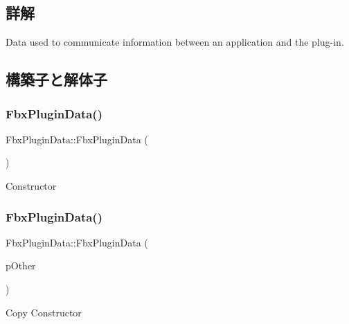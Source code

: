\subsection{詳解}
Data used to communicate information between an application and the plug-\/in. 

\subsection{構築子と解体子}
\mbox{\label{struct_fbx_plugin_data_a4fb32fb98910a0e08a042710f62cd9bd}} 
\subsubsection{\texorpdfstring{Fbx\+Plugin\+Data()}{FbxPluginData()}\hspace{0.1cm}{\footnotesize\ttfamily [1/2]}}
{\footnotesize\ttfamily Fbx\+Plugin\+Data\+::\+Fbx\+Plugin\+Data (\begin{DoxyParamCaption}{ }\end{DoxyParamCaption})}



Constructor 

\mbox{\label{struct_fbx_plugin_data_a917084f1dce5a4d57fd77aeec548bead}} 
\subsubsection{\texorpdfstring{Fbx\+Plugin\+Data()}{FbxPluginData()}\hspace{0.1cm}{\footnotesize\ttfamily [2/2]}}
{\footnotesize\ttfamily Fbx\+Plugin\+Data\+::\+Fbx\+Plugin\+Data (\begin{DoxyParamCaption}\item[{const \hyperlink{struct_fbx_plugin_data}{Fbx\+Plugin\+Data} \&}]{p\+Other }\end{DoxyParamCaption})\hspace{0.3cm}{\ttfamily [explicit]}}



Copy Constructor 



